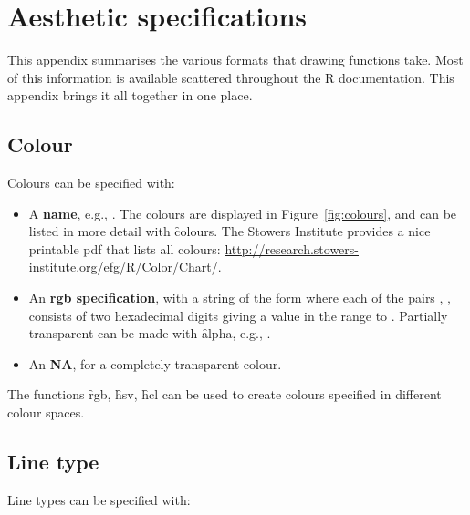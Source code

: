 

\chapter{Aesthetic specifications}
\label{cha:specifications}

This appendix summarises the various formats that  drawing functions take.  Most of this information is available scattered throughout the R documentation.  This appendix brings it all together in one place.

\section{Colour}
\label{sec:colour_spec}

Colours can be specified with:

\begin{itemize}
  \item A {\bf name}, e.g., . The colours are displayed in Figure~\ref{fig:colours}, and can be listed in more detail with \f{colours}. The Stowers Institute provides a nice printable pdf that lists all colours:  \url{http://research.stowers-institute.org/efg/R/Color/Chart/}.
    
  \item An {\bf rgb specification}, with a string of the form  where each of the pairs , ,  consists of two hexadecimal digits giving a value in the range  to .  Partially transparent can be made with \f{alpha}, e.g., .

  \item An {\bf NA}, for a completely transparent colour.  
\end{itemize}

The functions \f{rgb}, \f{hsv}, \f{hcl} can be used to create colours specified in different colour spaces.


\section{Line type}
\label{sec:line_type_spec}

Line types can be specified with:


